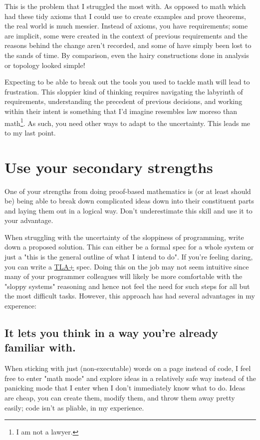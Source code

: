 \documentclass[11pt]{article}
\begin{document}
This is the problem that I struggled the most with. As opposed to math which had these tidy axioms that I could use to create examples and prove theorems, the real world is much messier. Instead of axioms, you have requirements; some are implicit, some were created in the context of previous requirements and the reasons behind the change aren't recorded, and some of have simply been lost to the sands of time. By comparison, even the hairy constructions done in analysis or topology looked simple!

Expecting to be able to break out the tools you used to tackle math will lead to frustration. This sloppier kind of thinking requires navigating the labyrinth of requirements, understanding the precedent of previous decisions, and working within their intent is something that I'd imagine resembles law moreso than math\footnote{I am not a lawyer.}. As such, you need other ways to adapt to the uncertainty. This leads me to my last point.

\section*{Use your secondary strengths}
\label{sec:orgd4a34be}
One of your strengths from doing proof-based mathematics is (or at least should be) being able to break down complicated ideas down into their constituent parts and laying them out in a logical way. Don't underestimate this skill and use it to your advantage.

When struggling with the uncertainty of the sloppiness of programming, write down a proposed solution. This can either be a formal spec for a whole system or just a "this is the general outline of what I intend to do". If you're feeling daring, you can write a \href{http://lamport.azurewebsites.net/tla/tla.html}{TLA+} spec. Doing this on the job may not seem intuitive since many of your programmer colleagues will likely be more comfortable with the "sloppy systems" reasoning and hence not feel the need for such steps for all but the most difficult tasks. However, this approach has had several advantages in my experence:

\subsection*{It lets you think in a way you're already familiar with.}
\label{sec:org58e098a}
When sticking with just (non-executable) words on a page instead of code, I feel free to enter "math mode" and explore ideas in a relatively safe way instead of the panicking mode that I enter when I don't immediately know what to do. Ideas are cheap, you can create them, modify them, and throw them away pretty easily; code isn't as pliable, in my experience.
\end{document}
